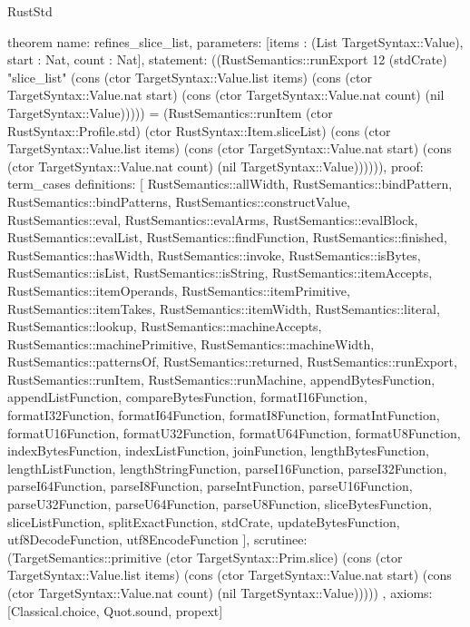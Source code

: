 \begin{lexlean}{RustStd}
\begin{semanticmodule}
theorem{
  name: refines_slice_list,
  parameters: [items : (List TargetSyntax::Value), start : Nat, count : Nat],
  statement: ((RustSemantics::runExport 12 (stdCrate) "slice_list" (cons (ctor TargetSyntax::Value.list items) (cons (ctor TargetSyntax::Value.nat start) (cons (ctor TargetSyntax::Value.nat count) (nil TargetSyntax::Value))))) = (RustSemantics::runItem (ctor RustSyntax::Profile.std) (ctor RustSyntax::Item.sliceList) (cons (ctor TargetSyntax::Value.list items) (cons (ctor TargetSyntax::Value.nat start) (cons (ctor TargetSyntax::Value.nat count) (nil TargetSyntax::Value)))))),
  proof: term_cases{
    definitions: [
      RustSemantics::allWidth,
      RustSemantics::bindPattern,
      RustSemantics::bindPatterns,
      RustSemantics::constructValue,
      RustSemantics::eval,
      RustSemantics::evalArms,
      RustSemantics::evalBlock,
      RustSemantics::evalList,
      RustSemantics::findFunction,
      RustSemantics::finished,
      RustSemantics::hasWidth,
      RustSemantics::invoke,
      RustSemantics::isBytes,
      RustSemantics::isList,
      RustSemantics::isString,
      RustSemantics::itemAccepts,
      RustSemantics::itemOperands,
      RustSemantics::itemPrimitive,
      RustSemantics::itemTakes,
      RustSemantics::itemWidth,
      RustSemantics::literal,
      RustSemantics::lookup,
      RustSemantics::machineAccepts,
      RustSemantics::machinePrimitive,
      RustSemantics::machineWidth,
      RustSemantics::patternsOf,
      RustSemantics::returned,
      RustSemantics::runExport,
      RustSemantics::runItem,
      RustSemantics::runMachine,
      appendBytesFunction,
      appendListFunction,
      compareBytesFunction,
      formatI16Function,
      formatI32Function,
      formatI64Function,
      formatI8Function,
      formatIntFunction,
      formatU16Function,
      formatU32Function,
      formatU64Function,
      formatU8Function,
      indexBytesFunction,
      indexListFunction,
      joinFunction,
      lengthBytesFunction,
      lengthListFunction,
      lengthStringFunction,
      parseI16Function,
      parseI32Function,
      parseI64Function,
      parseI8Function,
      parseIntFunction,
      parseU16Function,
      parseU32Function,
      parseU64Function,
      parseU8Function,
      sliceBytesFunction,
      sliceListFunction,
      splitExactFunction,
      stdCrate,
      updateBytesFunction,
      utf8DecodeFunction,
      utf8EncodeFunction
    ],
    scrutinee: (TargetSemantics::primitive (ctor TargetSyntax::Prim.slice) (cons (ctor TargetSyntax::Value.list items) (cons (ctor TargetSyntax::Value.nat start) (cons (ctor TargetSyntax::Value.nat count) (nil TargetSyntax::Value)))))
  },
  axioms: [Classical.choice, Quot.sound, propext]
}


\end{semanticmodule}
\end{lexlean}
